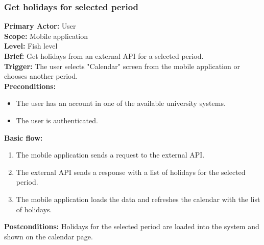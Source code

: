 \subsubsection{\large{Get holidays for selected period}}
\textbf{Primary Actor:} User\\
\textbf{Scope:} Mobile application\\
\textbf{Level:} Fish level\\
\textbf{Brief:} Get holidays from an external API for a selected period.\\
\textbf{Trigger:} The user selects "Calendar" screen from the mobile application or chooses another period.\\
\textbf{Preconditions:}
\begin{itemize}
    \item The user has an account in one of the available university systems.
    \item The user is authenticated.
\end{itemize}
\textbf{Basic flow:}
\begin{enumerate}
    \item The mobile application sends a request to the external API.
    \item The external API sends a response with a list of holidays for the selected period.
    \item The mobile application loads the data and refreshes the calendar with the list of holidays.
\end{enumerate}
\textbf{Postconditions:}
Holidays for the selected period are loaded into the system and shown on the calendar page.


